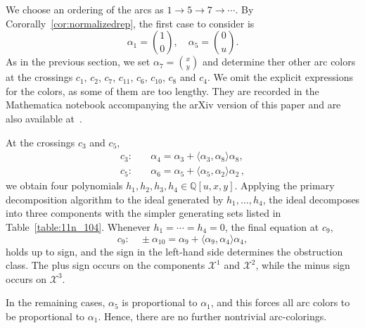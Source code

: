 \documentclass[12pt,reqno]{amsart}
\newcommand{\calX}{\mathcal{X}}
\newcommand{\lrbar}[1]{\langle #1 \rangle}
\theoremstyle{definition}
\begin{document}
	We choose an ordering of the arcs as $1 \rightarrow 5 \rightarrow 7 \rightarrow \cdots$.  By Cororally~\ref{cor:normalizedrep}, the first case to consider is
	$$
	\alpha_1=\binom{1}{0}, \quad \alpha_5=\binom{0}{u}.
	$$
	As in the previous section, we set $\alpha_7=\binom{x}{y}$ and determine ther other arc colors at the crossings $c_1$, $c_2$, $c_7$, $c_{11}$, $c_6$, $c_{10}$, $c_8$ and $c_4$.
	We omit the explicit expressions for the colors, as some of them are too lengthy. They are recorded in the Mathematica notebook accompanying the arXiv version of this paper and are also available at~\cite{diagramsite}.
	
	
	At the crossings $c_3$ and $c_5$,
	$$
	\begin{aligned}
		c_3 :& \quad \alpha_4 = \alpha_3 + \langle \alpha_3, \alpha_8\rangle \alpha_8, \\
		c_5 :& \quad \alpha_6 = \alpha_5 + \langle \alpha_5, \alpha_2\rangle \alpha_2 \, ,
	\end{aligned}
	$$
	we obtain four polynomials $h_1,h_2,h_3,h_4 \in \mathbb{Q}[u,x,y]$. Applying the primary decomposition algorithm to the ideal generated by $h_1,\ldots,h_4$, the ideal decomposes into three components with the simpler generating sets listed in Table~\ref{table:11n_104}. Whenever $h_1=\cdots=h_4=0$, the final equation at $c_9$,
	$$
	c_9:\quad \pm \alpha_{10}=\alpha_9+\langle \alpha_9,\alpha_4\rangle \alpha_4,
	$$
    holds up to sign, and the sign in the left-hand side determines the obstruction class. The plus sign occurs on the components $\calX^1$ and $\calX^2$, while the minus sign occurs on $\calX^3$.
	
	In the remaining cases, $\alpha_5$ is proportional to $\alpha_1$, and this  forces all arc colors to be proportional to $\alpha_1$. Hence, there are no further nontrivial arc-colorings.
	
\end{document}
